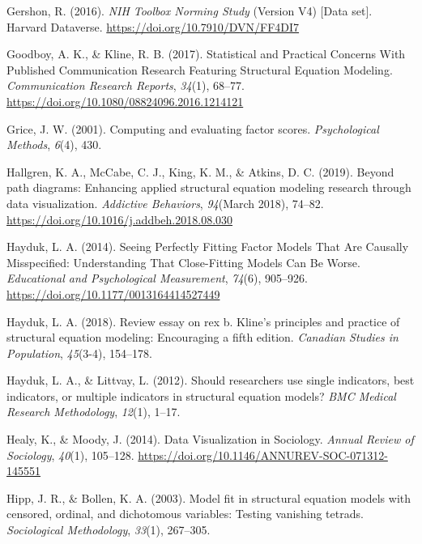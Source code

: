 \documentclass[
  english,
  man]{apa6}
\newlength{\cslhangindent}
\newenvironment{cslreferences}%
  {\setlength{\parindent}{0pt}%
  \everypar{\setlength{\hangindent}{\cslhangindent}}\ignorespaces}%
  {\par}
\begin{document}
\begin{cslreferences}
\leavevmode\hypertarget{ref-toolboxData}{}%
Gershon, R. (2016). \emph{NIH Toolbox Norming Study} (Version V4) {[}Data set{]}. Harvard Dataverse. \url{https://doi.org/10.7910/DVN/FF4DI7}

\leavevmode\hypertarget{ref-Goodboy2017}{}%
Goodboy, A. K., \& Kline, R. B. (2017). Statistical and Practical Concerns With Published Communication Research Featuring Structural Equation Modeling. \emph{Communication Research Reports}, \emph{34}(1), 68--77. \url{https://doi.org/10.1080/08824096.2016.1214121}

\leavevmode\hypertarget{ref-grice2001computing}{}%
Grice, J. W. (2001). Computing and evaluating factor scores. \emph{Psychological Methods}, \emph{6}(4), 430.

\leavevmode\hypertarget{ref-Hallgren2019a}{}%
Hallgren, K. A., McCabe, C. J., King, K. M., \& Atkins, D. C. (2019). Beyond path diagrams: Enhancing applied structural equation modeling research through data visualization. \emph{Addictive Behaviors}, \emph{94}(March 2018), 74--82. \url{https://doi.org/10.1016/j.addbeh.2018.08.030}

\leavevmode\hypertarget{ref-Hayduk2014}{}%
Hayduk, L. A. (2014). Seeing Perfectly Fitting Factor Models That Are Causally Misspecified: Understanding That Close-Fitting Models Can Be Worse. \emph{Educational and Psychological Measurement}, \emph{74}(6), 905--926. \url{https://doi.org/10.1177/0013164414527449}

\leavevmode\hypertarget{ref-hayduk2018review}{}%
Hayduk, L. A. (2018). Review essay on rex b. Kline's principles and practice of structural equation modeling: Encouraging a fifth edition. \emph{Canadian Studies in Population}, \emph{45}(3-4), 154--178.

\leavevmode\hypertarget{ref-hayduk2012should}{}%
Hayduk, L. A., \& Littvay, L. (2012). Should researchers use single indicators, best indicators, or multiple indicators in structural equation models? \emph{BMC Medical Research Methodology}, \emph{12}(1), 1--17.

\leavevmode\hypertarget{ref-Healy2014a}{}%
Healy, K., \& Moody, J. (2014). Data Visualization in Sociology. \emph{Annual Review of Sociology}, \emph{40}(1), 105--128. \url{https://doi.org/10.1146/ANNUREV-SOC-071312-145551}

\leavevmode\hypertarget{ref-hipp2003model}{}%
Hipp, J. R., \& Bollen, K. A. (2003). Model fit in structural equation models with censored, ordinal, and dichotomous variables: Testing vanishing tetrads. \emph{Sociological Methodology}, \emph{33}(1), 267--305.


\end{cslreferences}
\end{document}
